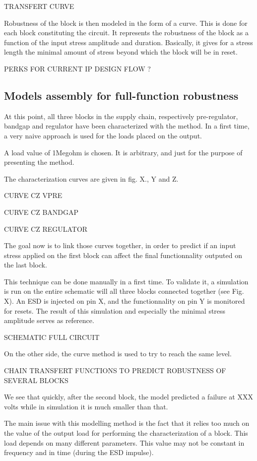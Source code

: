 TRANSFERT CURVE

Robustness of the block is then modeled in the form of a curve.
This is done for each block constituting the circuit.
It represents the robustness of the block as a function of the input stress amplitude and duration.
Basically, it gives for a stress length the minimal amount of stress beyond which the block will be in reset.

PERKS FOR CURRENT IP DESIGN FLOW ?

\subsection{Models assembly for full-function robustness}

At this point, all three blocks in the supply chain, respectively pre-regulator,
bandgap and regulator have been characterized with the method.
In a first time, a very naive approach is used for the loads placed on the output.

A load value of 1Megohm is chosen. It is arbitrary, and just for the purpose of
presenting the method.

The characterization curves are given in fig. X., Y and Z.

CURVE CZ VPRE

CURVE CZ BANDGAP

CURVE CZ REGULATOR

The goal now is to link those curves together, in order to predict if an input
stress applied on the first block can affect the final functionnality outputed
on the last block.

This technique can be done manually in a first time. To validate it,
a simulation is run on the entire schematic will all three blocks
connected together (see Fig. X).
An ESD is injected on pin X, and the functionnality on pin Y is monitored for resets.
The result of this simulation and especially the minimal stress amplitude serves as reference.

SCHEMATIC FULL CIRCUIT

On the other side, the curve method is used to try to reach the same level.

CHAIN TRANSFERT FUNCTIONS TO PREDICT ROBUSTNESS OF SEVERAL BLOCKS

We see that quickly, after the second block, the model predicted a failure at
XXX volts while in simulation it is much smaller than that.

The main issue with this modelling method is the fact that it relies too much
on the value of the output load for performing the characterization of a block.
This load depends on many different parameters.
This value may not be constant in frequency and in time (during the
ESD impulse).

